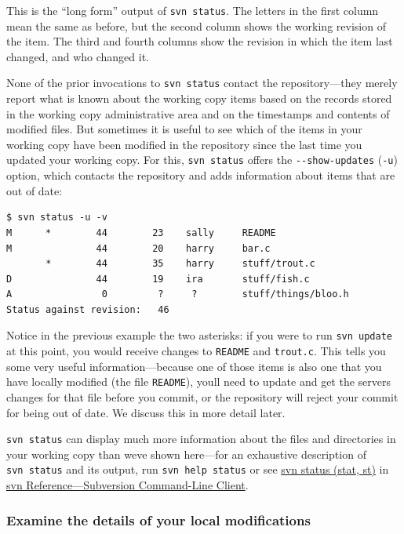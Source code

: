 This is the ``long form'' output of \texttt{svn\ status}. The letters in
the first column mean the same as before, but the second column shows
the working revision of the item. The third and fourth columns show the
revision in which the item last changed, and who changed it.

None of the prior invocations to \texttt{svn\ status} contact the
repository---they merely report what is known about the working copy
items based on the records stored in the working copy administrative
area and on the timestamps and contents of modified files. But sometimes
it is useful to see which of the items in your working copy have been
modified in the repository since the last time you updated your working
copy. For this, \texttt{svn\ status} offers the
\texttt{-\/-show-updates} (\texttt{-u}) option, which contacts the
repository and adds information about items that are out of date:

\begin{verbatim}
$ svn status -u -v
M      *        44        23    sally     README
M               44        20    harry     bar.c
       *        44        35    harry     stuff/trout.c
D               44        19    ira       stuff/fish.c
A                0         ?     ?        stuff/things/bloo.h
Status against revision:   46
\end{verbatim}

Notice in the previous example the two asterisks: if you were to run
\texttt{svn\ update} at this point, you would receive changes to
\texttt{README} and \texttt{trout.c}. This tells you some very useful
information---because one of those items is also one that you have
locally modified (the file \texttt{README}), you\textquotesingle ll need
to update and get the server\textquotesingle s changes for that file
before you commit, or the repository will reject your commit for being
out of date. We discuss this in more detail later.

\texttt{svn\ status} can display much more information about the files
and directories in your working copy than we\textquotesingle ve shown
here---for an exhaustive description of \texttt{svn\ status} and its
output, run \texttt{svn\ help\ status} or see
\hyperref[svn.ref.svn.c.status]{svn status (stat, st)} in
\hyperref[svn.ref.svn]{svn Reference---Subversion Command-Line Client}.

\subsubsection{Examine the details of your local
modifications}\label{svn.tour.cycle.examine.diff}


